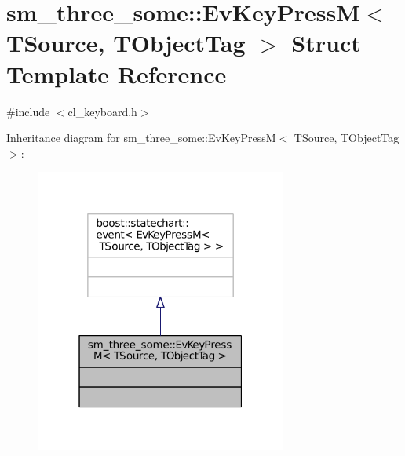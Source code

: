 \hypertarget{structsm__three__some_1_1EvKeyPressM}{}\section{sm\+\_\+three\+\_\+some\+:\+:Ev\+Key\+PressM$<$ T\+Source, T\+Object\+Tag $>$ Struct Template Reference}
\label{structsm__three__some_1_1EvKeyPressM}


{\ttfamily \#include $<$cl\+\_\+keyboard.\+h$>$}



Inheritance diagram for sm\+\_\+three\+\_\+some\+:\+:Ev\+Key\+PressM$<$ T\+Source, T\+Object\+Tag $>$\+:
\nopagebreak
\begin{figure}[H]
\begin{center}
\leavevmode
\includegraphics[width=235pt]{structsm__three__some_1_1EvKeyPressM__inherit__graph}
\end{center}
\end{figure}


